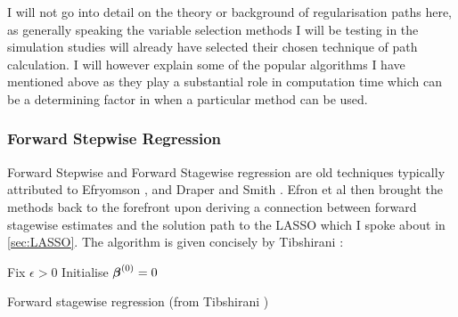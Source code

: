 I will not go into detail on the theory or background of regularisation paths here, as generally speaking the variable selection methods I will be testing in the simulation studies will already have selected their chosen technique of path calculation. I will however explain some of the popular algorithms I have mentioned above as they play a substantial role in computation time which can be a determining factor in when a particular method can be used.

\iffalse
\subsubsection{Newton-Raphson}

\subsubsection{LARS}

\subsubsection{LARS-EN}

\subsubsection{Coordinate Descent}
\fi
\subsubsection{Forward Stepwise Regression}

Forward Stepwise and Forward Stagewise regression are old techniques typically attributed to Efryomson , and Draper and Smith . Efron et al  then brought the methods back to the forefront upon deriving a connection between forward stagewise estimates and the solution path to the LASSO which I spoke about in \cref{sec:LASSO}. The algorithm is given concisely by Tibshirani :

\begin{algorithm}[H]
    Fix $\epsilon>0$\;
    Initialise $\boldsymbol{\beta}^{(0)}=0$\;
    \caption{Forward stagewise regression (from Tibshirani )}\label{alg:forward-stagewise-regression}
\end{algorithm}


